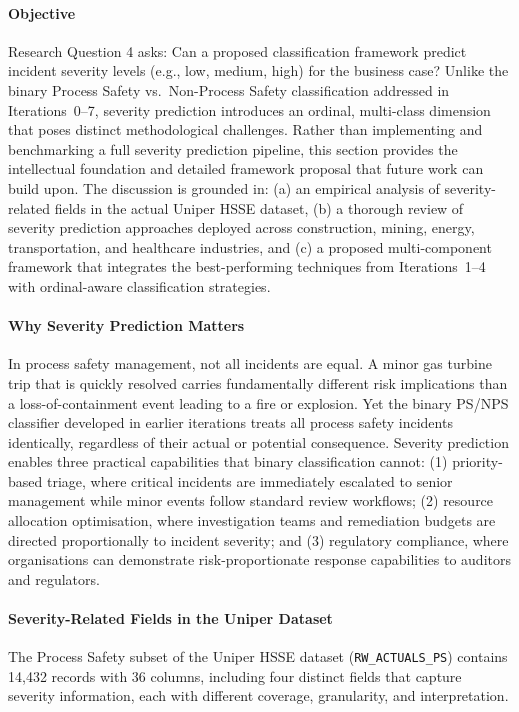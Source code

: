 \documentclass[11pt, titlepage, bibliography=totoc]{scrreprt}
\begin{document}
\paragraph{Objective}
Research Question 4 asks: Can a proposed classification framework predict incident severity levels (e.g., low, medium, high) for the business case? Unlike the binary Process Safety vs.\ Non-Process Safety classification addressed in Iterations~0--7, severity prediction introduces an ordinal, multi-class dimension that poses distinct methodological challenges. Rather than implementing and benchmarking a full severity prediction pipeline, this section provides the intellectual foundation and detailed framework proposal that future work can build upon. The discussion is grounded in: (a) an empirical analysis of severity-related fields in the actual Uniper HSSE dataset, (b) a thorough review of severity prediction approaches deployed across construction, mining, energy, transportation, and healthcare industries, and (c) a proposed multi-component framework that integrates the best-performing techniques from Iterations~1--4 with ordinal-aware classification strategies.

\paragraph{Why Severity Prediction Matters}
In process safety management, not all incidents are equal. A minor gas turbine trip that is quickly resolved carries fundamentally different risk implications than a loss-of-containment event leading to a fire or explosion. Yet the binary PS/NPS classifier developed in earlier iterations treats all process safety incidents identically, regardless of their actual or potential consequence. Severity prediction enables three practical capabilities that binary classification cannot: (1) priority-based triage, where critical incidents are immediately escalated to senior management while minor events follow standard review workflows; (2) resource allocation optimisation, where investigation teams and remediation budgets are directed proportionally to incident severity; and (3) regulatory compliance, where organisations can demonstrate risk-proportionate response capabilities to auditors and regulators.

\paragraph{Severity-Related Fields in the Uniper Dataset}
The Process Safety subset of the Uniper HSSE dataset (\texttt{RW\_ACTUALS\_PS}) contains 14{,}432 records with 36 columns, including four distinct fields that capture severity information, each with different coverage, granularity, and interpretation.
\end{document}
